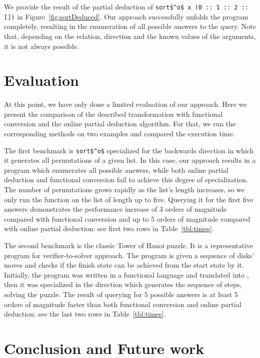 \documentclass[submission,copyright,creativecommons]{eptcs}
\begin{document}
We provide the result of the partial deduction of \lstinline{sort$^o$ x (0 :: 1 :: 2 :: [])} in Figure~\ref{fig:sortDeduced}. 
Our approach successfully unfolds the program completely, resulting in the enumeration of all possible answers to the query. 
Note that, depending on the relation, direction and the known values of the arguments, it is not always possible. 


\section{Evaluation}

At this point, we have only done a limited evaluation of our approach. 
Here we present the comparison of the described transformation with functional conversion and the online partial deduction algorithm. 
For that, we run the corresponding methods on two examples and compared the execution time. 

The first benchmark is \lstinline{sort$^o$} specialized for the backwards direction in which it generates all permutations of a given list. 
In this case, our approach results in a program which enumerates all possible answers, while both online partial deduction and functional conversion fail to achieve this degree of specialization.
The number of permutations grows rapidly as the list's length increases, so we only run the function on the list of length up to five. 
Querying it for the first five answers demonstrates the performance increase of 3 orders of magnitude compared with functional conversion and up to 5 orders of magnitude compared with online partial deduction: see first two rows in Table~\ref{tbl:times}. 

    

The second benchmark is the classic Tower of Hanoi puzzle. 
It is a representative program for verifier-to-solver approach. 
The program is given a sequence of disks' moves and checks if the finish state can be achieved from the start state by it. 
Initially, the program was written in a functional language and translated into \mk, then it was specialized in the direction which generates the sequence of steps, solving the puzzle. 
The result of querying for 5 possible answers is at least 5 orders of magnitude faster than both functional conversion and online partial deduction: see the last two rows in Table~\ref{tbl:times}. 

% 

\section{Conclusion and Future work}
\end{document}
